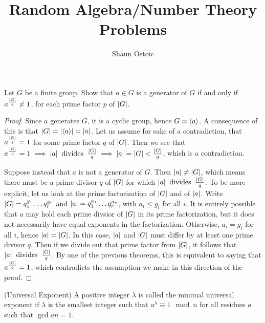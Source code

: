 \documentclass[11pt]{article}
\begin{document}
 
 
\title{Random Algebra/Number Theory Problems}
\author{Shaun Ostoic} 
 
\maketitle

\begin{exercise}{1}
Let $G$ be a finite group. Show that $a \in G$ is a generator of $G$ if and only if $a^{\frac{|G|}{q}} \neq 1$, for each prime factor $p$ of $|G|$.
\end{exercise}

\begin{proof}\necessary Since $a$ generates $G$, it is a cyclic group, hence $ G = \langle a \rangle $. A consequence of this is that $ |G| = |\langle a \rangle| = |a| $. Let us assume for sake of a contradiction, that $a^{\frac{|G|}{q}} = 1$ for some prime factor $ q $ of $ |G| $. Then we see that $ a^{\frac{|G|}{q}} = 1 \implies |a| \mathbin{\text{\ divides\ }} \frac{|G|}{q} \implies |a| = |G| < \frac{|G|}{q}$, which is a contradiction.

\sufficient Suppose instead that $ a $ is not a generator of $ G $. Then $|a| \neq |G| $, which means there must be a prime divisor $ q $ of $ |G| $ for which $ |a| \mathbin{\text{\ divides\ }} \frac{|G|}{q} $. To be more explicit, let us look at the prime factorization of $ |G| $ and of $ |a| $. Write $ |G| = q_{1}^{g_{1}} \dots q_{r}^{g_{r}}$ and $ |a| = q_{1}^{a_{1}} \dots q_{r}^{a_{r}}$, with $ a_{i} \leq g_{i} $ for all $ i $. It is entirely possible that $ a $ may hold each prime divsior of $ |G| $ in its prime factorization, but it does not necessarily have equal exponents in the factorization. Otherwise, $ a_{i} = g_{i} $ for all $ i $, hence $ |a| = |G| $. In this case, $ |a| $ and $ |G| $ must differ by at least one prime divisor $ q $. Then if we divide out that prime factor from $ |G| $, it follows that $ |a| \mathbin{\text{\ divides\ }} \frac{|G|}{q} $. By one of the previous theorems, this is equivalent to saying that $ a^{\frac{|G|}{q}} = 1 $, which contradicts the assumption we make in this direction of the proof.

\end{proof}

\begin{definition}{(Universal Exponent)}
A positive integer $ \lambda  $ is called the minimal universal exponent if $ \lambda $ is the smallest integer such that $ a^{\lambda} \equiv 1 \mod n$ for all residues $ a $ such that $ \gcd{a}{n} = 1$.
\end{definition}
\end{document}
